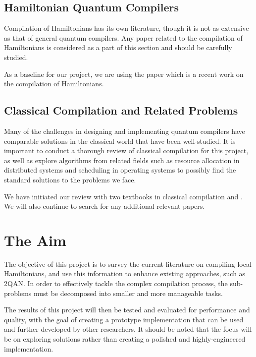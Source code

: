 \documentclass{article}
\begin{document}
\printbibliography[heading=none,keyword=general]

\subsection{Hamiltonian Quantum Compilers}

Compilation of Hamiltonians has its own literature, though  it is not as extensive as that of general quantum compilers. Any paper related to the compilation of Hamiltonians is considered as a part of this section and should be carefully studied.


As a baseline for our project, we are using the paper \cite{lao2021} which is a recent work on the compilation of Hamiltonians.

\printbibliography[heading=none,keyword=hamiltonian]

\subsection{Classical Compilation and Related Problems}

Many of the challenges in designing and implementing quantum compilers have comparable solutions in the classical world that have been well-studied. It is important to conduct a thorough review of classical compilation for this project, as well as explore algorithms from related fields such as resource allocation in distributed systems and scheduling in operating systems to possibly find the standard solutions to the problems we face.

We have initiated our review with two textbooks in classical compilation \cite{aho1986} and \cite{allen2001}. We will also continue to search for any additional relevant papers.

\printbibliography[heading=none,keyword=classical]

\section{The Aim}

The objective of this project is to survey the current literature on compiling local Hamiltonians, and use this information to enhance existing approaches, such as 2QAN. In order to effectively tackle the complex compilation process, the sub-problems must be decomposed into smaller and more manageable tasks.

The results of this project will then be tested and evaluated for performance and quality, with the goal of creating a prototype implementation that can be used and further developed by other researchers. It should be noted that the focus will be on exploring solutions rather than creating a polished and highly-engineered implementation.
\end{document}
